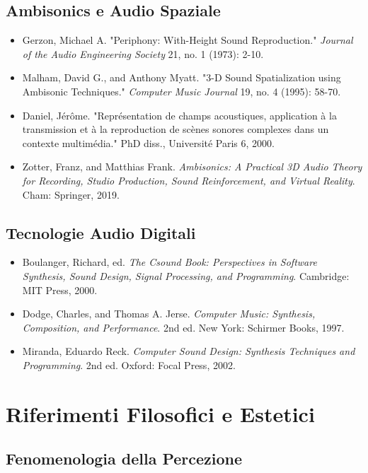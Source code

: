 \documentclass[a4paper,11pt,openany]{book}
\begin{document}
\subsection{Ambisonics e Audio Spaziale}

\begin{itemize}
    \item Gerzon, Michael A. "Periphony: With-Height Sound Reproduction." \textit{Journal of the Audio Engineering Society} 21, no. 1 (1973): 2-10.
    \item Malham, David G., and Anthony Myatt. "3-D Sound Spatialization using Ambisonic Techniques." \textit{Computer Music Journal} 19, no. 4 (1995): 58-70.
    \item Daniel, Jérôme. "Représentation de champs acoustiques, application à la transmission et à la reproduction de scènes sonores complexes dans un contexte multimédia." PhD diss., Université Paris 6, 2000.
    \item Zotter, Franz, and Matthias Frank. \textit{Ambisonics: A Practical 3D Audio Theory for Recording, Studio Production, Sound Reinforcement, and Virtual Reality}. Cham: Springer, 2019.
\end{itemize}

\subsection{Tecnologie Audio Digitali}

\begin{itemize}
    \item Boulanger, Richard, ed. \textit{The Csound Book: Perspectives in Software Synthesis, Sound Design, Signal Processing, and Programming}. Cambridge: MIT Press, 2000.
    \item Dodge, Charles, and Thomas A. Jerse. \textit{Computer Music: Synthesis, Composition, and Performance}. 2nd ed. New York: Schirmer Books, 1997.
    \item Miranda, Eduardo Reck. \textit{Computer Sound Design: Synthesis Techniques and Programming}. 2nd ed. Oxford: Focal Press, 2002.
\end{itemize}

\section{Riferimenti Filosofici e Estetici}

\subsection{Fenomenologia della Percezione}
\end{document}
